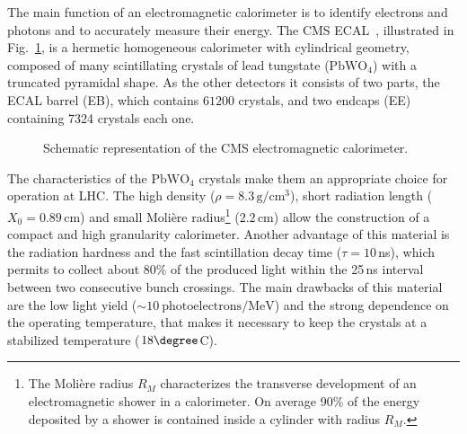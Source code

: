 The main function of an electromagnetic calorimeter is to identify electrons and photons and to accurately measure their energy. The CMS ECAL~\cite{ecal,Bloch:581342}, illustrated in Fig.~\ref{fig:ecal}, is a hermetic homogeneous calorimeter with cylindrical geometry, composed of many scintillating crystals of lead tungstate ($\mathrm{PbWO_4}$) with a truncated pyramidal shape. As the other detectors it consists of two parts, the ECAL barrel (EB), which contains $61200$ crystals, and two endcaps (EE) containing 7324 crystals each one.

\begin{figure}[htb]
\centering
{}
\caption{Schematic representation of the CMS electromagnetic calorimeter.}\label{fig:ecal}
\end{figure}

The characteristics of the $\mathrm{PbWO_4}$ crystals make them an appropriate choice for operation at LHC. The high density ($\rho=8.3\,\mathrm{g/cm^3}$), short radiation length ($X_0 = 0.89\,\mathrm{cm}$) and small Moli\`ere radius\footnote{The Moli\`ere radius $R_M$ characterizes the transverse development of an electromagnetic shower in a calorimeter. On average 90\% of the energy deposited by a shower is contained inside a cylinder with radius $R_M$.} ($2.2$\,cm) allow the construction of a compact and high granularity calorimeter. Another advantage of this material is the radiation hardness and the fast scintillation decay time ($\tau = 10$\,ns), which permits to collect about 80\% of the produced light within the 25\,ns interval between two consecutive bunch crossings. The main drawbacks of this material are the low light yield ($\sim 10~\mathrm{photoelectrons/MeV}$) and the strong dependence on the operating temperature, that makes it necessary to keep the crystals at a stabilized temperature ($18\degree$C).

